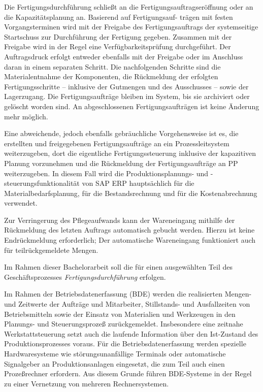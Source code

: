 Die Fertigungsdurchführung schließt an die Fertigungsauftragseröffnung oder an die Kapazitätsplanung an. Basierend auf Fertigungsauf- trägen mit festen Vorgangsterminen wird mit der Freigabe des Fertigungsauftrags der systemseitige Startschuss zur Durchführung der Fertigung gegeben. Zusammen mit der Freigabe wird in der Regel eine Verfügbarkeitsprüfung durchgeführt. Der Auftragsdruck erfolgt entweder ebenfalls mit der Freigabe oder im Anschluss daran in einem separaten Schritt. Die nachfolgenden Schritte sind die Materialentnahme der Komponenten, die Rückmeldung der erfolgten Fertigungsschritte – inklusive der Gutmengen und des Ausschusses – sowie der Lagerzugang. Die Fertigungsaufträge bleiben im System, bis sie archiviert oder gelöscht worden sind. An abgeschlossenen Fertigungsaufträgen ist keine Änderung mehr möglich.

Eine abweichende, jedoch ebenfalls gebräuchliche Vorgehensweise ist es, die erstellten und freigegebenen Fertigungsaufträge an ein Prozessleitsystem weiterzugeben, dort die eigentliche Fertigungssteuerung inklusive der kapazitiven Planung vorzunehmen und die Rückmeldung der Fertigungsaufträge an PP weiterzugeben. In diesem Fall wird die Produktionsplanungs- und -steuerungsfunktionalität von SAP ERP hauptsächlich für die Materialbedarfsplanung, für die Bestandsrechnung und für die Kostenabrechnung verwendet.

Zur Verringerung des Pflegeaufwands kann der Wareneingang mithilfe der Rückmeldung des letzten Auftrags automatisch gebucht werden. Hierzu ist keine Endrückmeldung erforderlich; Der automatische Wareneingang funktioniert auch für teilrückgemeldete Mengen.

Im Rahmen dieser Bachelorarbeit soll die  für einen ausgewählten Teil des Geschäftsprozesses \textit{Fertigungsdurchführung} erfolgen.


Im Rahmen der Betriebsdatenerfassung (BDE) werden die realisierten Mengen- und Zeitwerte der Aufträge und Mitarbeiter, Stillstands- und Ausfallzeiten von Betriebsmitteln sowie der Einsatz von Materialien und Werkzeugen in den Planungs- und Steuerungsprozeß zurückgemeldet. Insbesondere eine zeitnahe Werkstattsteuerung setzt auch die laufende Information über den Ist-Zustand des Produktionsprozesses voraus. Für die Betriebsdatenerfassung werden spezielle Hardwaresysteme wie störungsunanfällige Terminals oder automatische Signalgeber an Produktionsanlagen eingesetzt, die zum Teil auch einen Prozeßrechner erfordern. Aus diesem Grunde führen BDE-Systeme in der Regel zu einer Vernetzung von mehreren Rechnersystemen.

